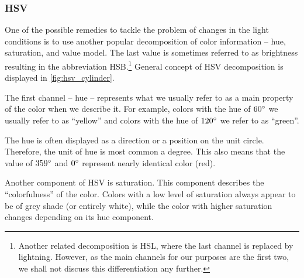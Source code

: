 \subsubsection{HSV}

One of the possible remedies to tackle the problem of changes in the light conditions is to use another popular decomposition of color information -- hue, saturation, and value model. The last value is sometimes referred to as brightness resulting in the abbreviation HSB.\footnote{Another related decomposition is HSL, where the last channel is replaced by lightning. However, as the main channels for our purposes are the first two, we shall not discuss this differentiation any further.} General concept of HSV decomposition is displayed in \autoref{fig:hsv_cylinder}.

The first channel -- hue -- represents what we usually refer to as a main property of the color when we describe it. For example, colors with the hue of $60\degree$ we usually refer to as ``yellow'' and colors with the hue of $120\degree$ we refer to as ``green''.

The hue is often displayed as a direction or a position on the unit circle. Therefore, the unit of hue is most common a degree. This also means that the value of $359\degree$ and $0\degree$ represent nearly identical color (red).



Another component of HSV is saturation. This component describes the ``colorfulness'' of the color. Colors with a low level of saturation always appear to be of grey shade (or entirely white), while the color with higher saturation changes depending on its hue component.


